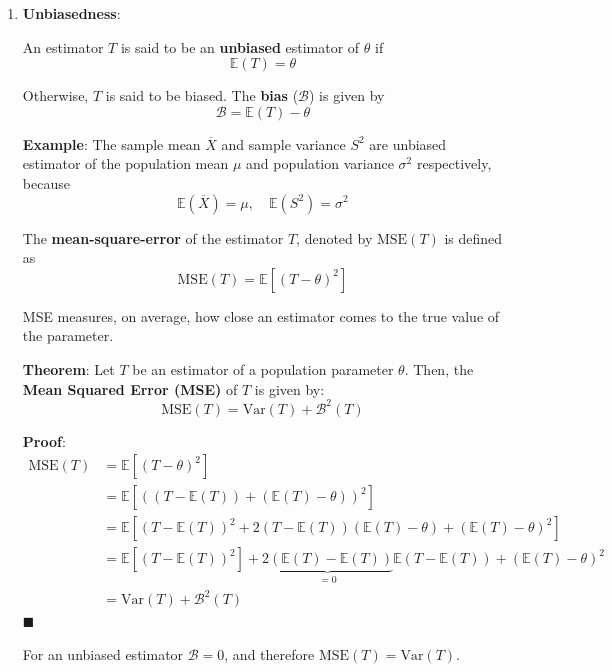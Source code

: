 \documentclass[twoside]{book}
\begin{document}
\begin{enumerate}
    \item \textbf{Unbiasedness}: 
    \begin{textbox}
    An estimator \( T \) is said to be an \textbf{unbiased} estimator of $\theta$ if
    \[
        \mathbb{E}(T) = \theta
        \]
    \end{textbox}
    Otherwise, $T$ is said to be biased. The \textbf{bias} ($\mathcal{B}$) is given by
    $$\mathcal{B} = \mathbb{E}(T) - \theta$$
    
    \textbf{Example}: The sample mean $\overline{X}$ and sample variance $S^2$ are unbiased estimator of the population mean $\mu$ and population variance $\sigma^2$ respectively, because
    $$\mathbb{E}\left( \overline{X}\right) = \mu, \quad \mathbb{E}\left( S^2\right) = \sigma^2$$
    
    \begin{textbox}
    The \textbf{mean-square-error} of the estimator $T$, denoted by $\textrm{MSE}(T)$ is defined as
        $$\mathrm{MSE}(T) = \mathbb{E}\left[\left( T-\theta\right) ^2\right]$$
    \end{textbox}
    
    MSE measures, on average, how close an estimator comes to the true value of the parameter.
    
    \begin{textbox}
    \textbf{Theorem}: Let \( T \) be an estimator of a population parameter \( \theta \). Then, the \textbf{Mean Squared Error (MSE)} of \( T \) is given by:
    \[
    \mathrm{MSE}(T) = \mathrm{Var}(T) + \mathcal{B}^2(T)
    \]
    \end{textbox}
    \textbf{Proof}:
    \begin{align*}
    \mathrm{MSE}(T) &= \mathbb{E}\left[(T - \theta)^2\right] \\
    &= \mathbb{E}\left[\left((T - \mathbb{E}(T)) + (\mathbb{E}(T) - \theta)\right)^2\right] \\
    &= \mathbb{E}\left[(T - \mathbb{E}(T))^2 + 2(T - \mathbb{E}(T))(\mathbb{E}(T) - \theta) + (\mathbb{E}(T) - \theta)^2\right] \\
    &= \mathbb{E}[(T - \mathbb{E}(T))^2] + \underbrace{2(\mathbb{E}(T) - \mathbb{E}(T))}_{= 0}\mathbb{E}\left( T - \mathbb{E}(T)\right)  + (\mathbb{E}(T) - \theta)^2 \\
    &= \mathrm{Var}(T) + \mathcal{B}^2(T)
    \end{align*}
    \hfill $\blacksquare$
    
    For an unbiased estimator $\mathcal{B} = 0$, and therefore $\mathrm{MSE}(T) = \mathrm{Var}(T)$.
    

\end{enumerate}
\end{document}
